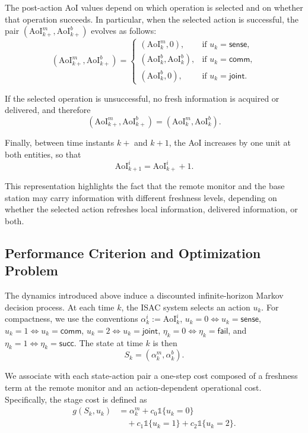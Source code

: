 \documentclass[letterpaper,journal]{IEEEtran}
\begin{document}
The post-action AoI values depend on which operation is selected and on whether that operation succeeds. In particular, when the selected action is successful, the pair $(\mathrm{AoI}^m_{k+}, \mathrm{AoI}^b_{k+})$ evolves as follows:
\begin{equation}
(\mathrm{AoI}^m_{k+}, \mathrm{AoI}^b_{k+})=
\begin{cases}
(\mathrm{AoI}^m_k, 0), & \text{if } u_k=\mathsf{sense},\\
(\mathrm{AoI}^b_k, \mathrm{AoI}^b_k), & \text{if } u_k=\mathsf{comm},\\
(\mathrm{AoI}^b_k, 0), & \text{if } u_k=\mathsf{joint}.
\end{cases}
\end{equation}

If the selected operation is unsuccessful, no fresh information is acquired or delivered, and therefore
\[
(\mathrm{AoI}^m_{k+}, \mathrm{AoI}^b_{k+})=
(\mathrm{AoI}^m_k, \mathrm{AoI}^b_k).
\]

Finally, between time instants $k+$ and $k+1$, the AoI increases by one unit at both entities, so that
\[
\mathrm{AoI}^i_{k+1} = \mathrm{AoI}^i_{k+} + 1.
\]

This representation highlights the fact that the remote monitor and the base station may carry information with different freshness levels, depending on whether the selected action refreshes local information, delivered information, or both.
	
	
\subsection{Performance Criterion and Optimization Problem}

The dynamics introduced above induce a discounted infinite-horizon Markov decision process. At each time $k$, the ISAC system selects an action $u_k$. For compactness, we use the conventions $\alpha^i_k:=\mathrm{AoI}^i_k$, $u_k=0 \Leftrightarrow u_k=\mathsf{sense}$, $u_k=1 \Leftrightarrow u_k=\mathsf{comm}$, $u_k=2 \Leftrightarrow u_k=\mathsf{joint}$, $\eta_k=0 \Leftrightarrow \eta_k=\mathsf{fail}$, and $\eta_k=1 \Leftrightarrow \eta_k=\mathsf{succ}$. The state at time $k$ is then
\[
S_k=(\alpha^m_k,\alpha^b_k).
\]

We associate with each state-action pair a one-step cost composed of a freshness term at the remote monitor and an action-dependent operational cost. Specifically, the stage cost is defined as
\begin{equation}\label{eq:stage-cost-base}
\begin{aligned}
g(S_k,u_k)&=\alpha^m_k+c_0\mathds{1}\{u_k=0\}\\
&\quad+c_1\mathds{1}\{u_k=1\}+c_2\mathds{1}\{u_k=2\}.
\end{aligned}
\end{equation}
\end{document}

